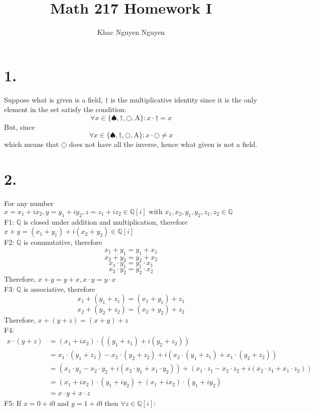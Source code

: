 \documentclass[11pt]{article}
\title{\textbf{Math 217 Homework I}}
\author{Khac Nguyen Nguyen}
\date{}
\begin{document}
	


\section*{1.}
Suppose what is given is a field, $\dagger$ is the multiplicative identity since it is the only element in the set satisfy the condition:
\[
\forall x \in \{ \spadesuit, \dagger, \bigcirc, \text{A} \}: x \cdot \dagger = x
\]
But, since
\[
\forall x \in \{ \spadesuit, \dagger, \bigcirc, \text{A} \}: x \cdot \bigcirc \ne x
\]
which means that $\bigcirc$ does not have all the inverse, hence
what given is not a field.






\pagebreak
\section*{2.}
For any number 	$x = x_1 + ix_2, y = y_1 + iy_2, z = z_1 + iz_2 \in \mathbb{Q}[i] \text{ with } x_1, x_2, y_1, y_2, z_1, z_2 \in \mathbb{Q}$ \\
F1: $\mathbb{Q}$ is closed under addition and multiplication, therefore \\
$x+y = (x_1+y_1) + i(x_2+y_2) \in \mathbb{Q}[i]$\\
F2: $\mathbb{Q}$ is commutative, therefore
\[x_1+y_1 = y_1+x_1\]
\[x_2+y_2 = y_2 + x_2\]
\[x_1 \cdot y_1 = y_1 \cdot x_1\]
\[x_2 \cdot y_2 = y_2 \cdot x_2\]
Therefore, $x+y = y+x, x \cdot y = y \cdot x$  \\
F3: $\mathbb{Q}$ is associative, therefore
\[x_1 + (y_1+z_1) = (x_1 + y_1) +z_1\]
\[x_2 + (y_2+z_2) = (x_2 + y_2) +z_2\]
Therefore, $x+(y+z) = (x+y)+z$ \\
F4: 
\begin{equation*}
\begin{aligned}
x \cdot (y+z) 
&= (x_1 + ix_2) \cdot ((y_1 + z_1) + i(y_2+z_2)) \\
&= x_1 \cdot (y_1 + z_1) - x_2 \cdot (y_2 + z_2) + i(x_2 \cdot (y_1 + z_1) + x_1 \cdot (y_2 + z_2)) \\
&= (x_1 \cdot y_1 -x_2 \cdot y_2 + i(x_2 \cdot y_1 + x_1 \cdot y_2)) + (x_1 \cdot z_1 - x_2 \cdot z_2 + i(x_2 \cdot z_1 + x_1 \cdot z_2))\\
&= (x_1 + ix_2) \cdot (y_1 + iy_2) + (x_1+ ix_2) \cdot (y_1 + iy_2) \\
&=x \cdot y + x \cdot z
\end{aligned}
\end{equation*}
F5: If $x = 0 + i0 \text{ and } y = 1 + i0$ then $\forall z \in \mathbb{Q}[i]:$
\end{document}
